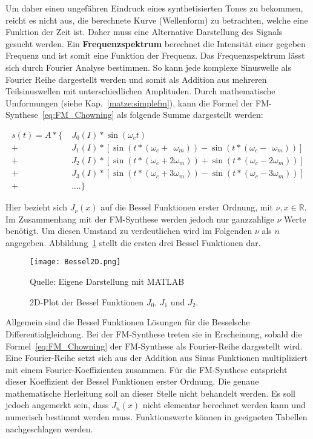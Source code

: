 Um daher einen ungefähren Eindruck eines synthetisierten Tones zu bekommen, reicht es nicht aus, die berechnete Kurve (Wellenform) zu betrachten, welche eine Funktion der Zeit ist. Daher muss eine Alternative Darstellung des Signals gesucht werden. Ein \textbf{Frequenzspektrum} berechnet die Intensität einer gegeben Frequenz und ist somit eine Funktion der Frequenz. Das Frequenzspektrum lässt sich durch Fourier Analyse bestimmen. So kann jede komplexe Sinuswelle als Fourier Reihe dargestellt werden und somit als Addition aus mehreren Teilsinuswellen mit unterschiedlichen Amplituden. \cite[S. 33]{raichel} Durch mathematische Umformungen (siehe Kap.~\ref{matze:simplefm}), kann die Formel der FM-Synthese~\ref{eq:FM_Chowning} als folgende Summe dargestellt werden: \cite{chowningPaper}

\begin{equation}
\begin{split}
s(t)=A*\{\; & J_0(I)*\sin(\omega_c t)  \\
         +&J_1(I)*[\sin(t*(\omega_c + \;\,\omega_m))-\sin(t*(\omega_c-\;\,\omega_m))] \\
         +&J_2(I)*[\sin(t*(\omega_c + 2\omega_m))+\sin(t*(\omega_c-2\omega_m))] \\
         +&J_3(I)*[\sin(t*(\omega_c + 3\omega_m))-\sin(t*(\omega_c-3\omega_m))] \\
         +&....\}
\end{split}
\label{eq:chowningAddition}
\end{equation}

Hier bezieht sich $J_\nu(x)$ auf die Bessel Funktionen erster Ordnung, mit $\nu,x \in \mathbb{R}$. \cite[S. 223]{temme} Im Zusammenhang mit der FM-Synthese werden jedoch nur ganzzahlige $\nu$ Werte benötigt. Um diesen Umstand zu verdeutlichen wird im Folgenden $\nu$ als $n$ angegeben. Abbildung~\ref{fig:bessel2D} stellt die ersten drei Bessel Funktionen dar.

\begin{figure} [ht]
\centering
  \texttt{[image: Bessel2D.png]}
\caption{2D-Plot der Bessel Funktionen $J_0$, $J_1$ und $J_2$.}
\label{fig:bessel2D}
Quelle: Eigene Darstellung mit MATLAB
\end{figure}

\FloatBarrier


Allgemein sind die Bessel Funktionen Lösungen für die Besselsche Differentialgleichung.\cite[S. 220]{temme} Bei der FM-Synthese treten sie in Erscheinung, sobald die Formel~\ref{eq:FM_Chowning} der FM-Synthese als Fourier-Reihe dargestellt wird. Eine Fourier-Reihe setzt sich aus der Addition aus Sinus Funktionen multipliziert mit einem Fourier-Koeffizienten zusammen. Für die FM-Synthese entspricht dieser Koeffizient der Bessel Funktionen erster Ordnung. \cite[S. 221]{lathi} Die genaue mathematische Herleitung soll an dieser Stelle nicht behandelt werden. Es soll jedoch angemerkt sein, dass $J_n(x)$ nicht elementar berechnet werden kann und numerisch bestimmt werden muss.\cite[S. 385]{abramowitz} Funktionswerte können in geeigneten Tabellen nachgeschlagen werden. \cite{davis}

